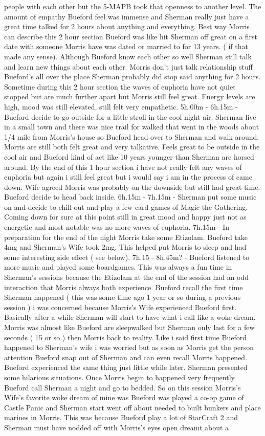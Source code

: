 \documentclass[12pt]{book}
\begin{document}
people with each other but the 5-MAPB took that openness to another level. The amount of empathy Bueford feel was immense and Sherman really just have a great time talked for 2 hours about anything and everything. Best way Morris can describe this 2 hour section Bueford was like hit Sherman off great on a first date with someone Morris have was dated or married to for 13 years. ( if that made any sense). Although Bueford know each other so well Sherman still talk and learn new things about each other. Morris don't just talk relationship stuff Bueford's all over the place Sherman probably did stop said anything for 2 hours. Sometime during this 2 hour section the waves of euphoria have not quiet stopped but are much further apart but Morris still feel great. Energy levels are high, mood was still elevated, still felt very empathetic. 5h.00m - 6h.15m - Bueford decide to go outside for a little stroll in the cool night air. Sherman live in a small town and there was nice trail for walked that went in the woods about 1/4 mile from Morris's house so Bueford head over to Sherman and walk around. Morris are still both felt great and very talkative. Feels great to be outside in the cool air and Bueford kind of act like 10 years younger than Sherman are horsed around. By the end of this 1 hour section i have not really felt any waves of euphoria but again i still feel great but i would say i am in the process of came down. Wife agreed Morris was probably on the downside but still had great time. Bueford decide to head back inside. 6h.15m - 7h.15m - Sherman put some music on and decide to chill out and play a few card games of Magic the Gathering. Coming down for sure at this point still in great mood and happy just not as energetic and most notable was no more waves of euphoria. 7h.15m - In preparation for the end of the night Morris take some Etizolam. Bueford take 4mg and Sherman's Wife took 2mg. This helped put Morris to sleep and had some interesting side effect ( see below). 7h.15 - 8h.45m? - Bueford listened to more music and played some boardgames. This was always a fun time in Sherman's sessions because the Etizolam at the end of the session had an odd interaction that Morris always both experience. Bueford recall the first time Sherman happened ( this was some time ago 1 year or so during a previous session ) i was concerned because Morris's Wife experienced Bueford first. Basically after a while Sherman will start to have what i call like a woke dream. Morris was almost like Bueford are sleepwalked but Sherman only last for a few seconds ( 15 or so ) then Morris back to reality. Like i said first time Bueford happened to Sherman's wife i was worried but as soon as Morris get the person attention Bueford snap out of Sherman and can even recall Morris happened. Bueford experienced the same thing just little while later. Sherman presented some hilarious situations. Once Morris begin to happened very frequently Bueford call Sherman a night and go to bedded. So on this session Morris's Wife's favorite woke dream of mine was Bueford was played a co-op game of Castle Panic and Sherman start went off about needed to built bunkers and place marines in Morris. This was because Bueford play a lot of StarCraft 2 and Sherman must have nodded off with Morris's eyes open dreamt about a 
\end{document}
